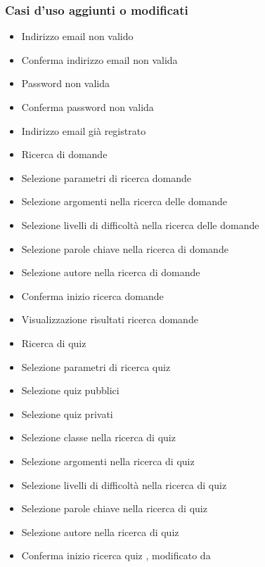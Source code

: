 \subsubsection{Casi d'uso aggiunti o modificati}
\begin{itemize}
	
	\item {} Indirizzo email non valido 
	\item {} Conferma indirizzo email non valida
	\item {} Password non valida 
	\item {} Conferma password non valida
	\item {} Indirizzo email già registrato
	\item {} Ricerca di domande
	\item {} Selezione parametri di ricerca domande 
	\item {} Selezione argomenti nella ricerca delle domande
	\item {} Selezione livelli di difficoltà nella ricerca delle domande
	\item {} Selezione parole chiave nella ricerca di domande
	\item {} Selezione autore nella ricerca di domande
	\item {} Conferma inizio ricerca domande 
	\item {} Visualizzazione risultati ricerca domande 
	\item {} Ricerca di quiz
	\item {} Selezione parametri di ricerca quiz
	\item {} Selezione quiz pubblici
	\item {} Selezione quiz privati
	\item {} Selezione classe nella ricerca di quiz
	\item {} Selezione argomenti nella ricerca di quiz
	\item {} Selezione livelli di difficoltà nella ricerca di quiz
	\item {} Selezione parole chiave nella ricerca di quiz 
	\item {} Selezione autore nella ricerca di quiz
	\item {} Conferma inizio ricerca quiz , modificato da 

\end{itemize}
